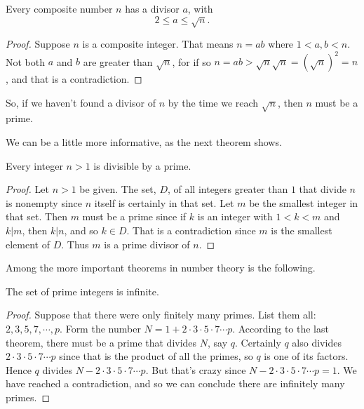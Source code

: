 \begin{thm}
Every composite number $n$ has a divisor $a$, with \[2\leq a\leq \sqrt{n}.\]
\end{thm}
\begin{proof} 
Suppose $n$ is a composite integer. That means 
$n=ab$  where $1<a,b<n$.  Not both $a$ and $b$ are greater than 
$\sqrt{n}$, for if so
 $n=ab>\sqrt{n}\sqrt{n}=(\sqrt{n})^2=n$, and that is a 
contradiction.
\end{proof}

So, if we haven't found a divisor of $n$ by the time we reach
$\sqrt{n}$, then $n$ must be a prime.

We can be a little more informative, as the next theorem shows.

\begin{thm}
Every integer $n>1$ is divisible by a prime.
\end{thm}
\begin{proof}
Let $n>1$ be given. The set, $D$, of all integers greater
than $1$  that divide $n$ is nonempty since $n$ itself is certainly in that
set. Let $m$ be the smallest integer in that set. Then $m$ must be a prime
since if $k$ is an integer with $1<k<m$ and $k|m$, then $k|n$, and so
$k\in D$. That is a contradiction since $m$ is the smallest element of 
$D$. Thus $m$ is a prime divisor of $n$.
\end{proof}


Among the more important theorems in number theory is the following.
\begin{thm}
The set of prime integers is infinite.
\end{thm}
\begin{proof}
Suppose that there were only finitely many primes.
List them all: $2,3,5,7,\cdots,p$. Form the number 
$N=1+2\cdot3\cdot5\cdot7\cdots p$. According to the last theorem, there
must be a prime that divides $N$, say $q$. Certainly $q$ also
divides $2\cdot3\cdot5\cdot7\cdots p$ since that is the product of all 
the primes, so $q$ is one of its factors. Hence $q$ divides
$N-2\cdot3\cdot5\cdot7\cdots p$. But that's crazy since
$N-2\cdot3\cdot5\cdot7\cdots p=1$. We have reached a contradiction,
and so we can conclude there are infinitely many primes.
\end{proof}

